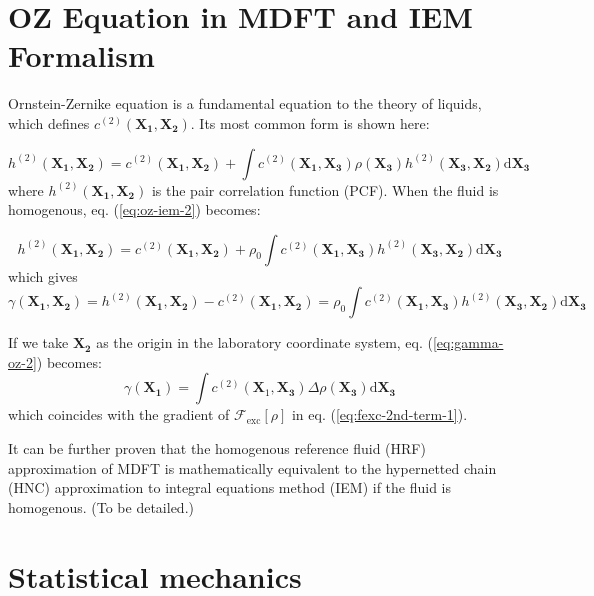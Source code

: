 \section{OZ Equation in MDFT and IEM Formalism}

Ornstein-Zernike equation is a fundamental equation to the theory
of liquids, which defines $c^{(2)}(\mathbf{X_{1}},\mathbf{X_{2}})$.
Its most common form is shown here\citep{Hensen-McDonald}:

\begin{equation}
h^{(2)}(\mathbf{X_{1}},\mathbf{X_{2}})=c^{(2)}(\mathbf{X_{1}},\mathbf{X_{2}})+\int c^{(2)}(\mathbf{X_{1}},\mathbf{X_{3}})\rho(\mathbf{X_{3}})h^{(2)}(\mathbf{X_{3}},\mathbf{X_{2}})\mathrm{d}\mathbf{X_{3}}\label{eq:oz-iem-2}
\end{equation}
where $h^{(2)}(\mathbf{X_{1}},\mathbf{X_{2}})$ is the pair correlation
function (PCF). When the fluid is homogenous, eq. (\ref{eq:oz-iem-2})
becomes:

\begin{equation}
h^{(2)}(\mathbf{X_{1}},\mathbf{X_{2}})=c^{(2)}(\mathbf{X_{1}},\mathbf{X_{2}})+\rho_{0}\int c^{(2)}(\mathbf{X_{1}},\mathbf{X_{3}})h^{(2)}(\mathbf{X_{3}},\mathbf{X_{2}})\mathrm{d}\mathbf{X_{3}}\label{eq:oz-iem-1-1}
\end{equation}
which gives 
\begin{equation}
\gamma(\mathbf{X_{1}},\mathbf{X_{2}})=h^{(2)}(\mathbf{X_{1}},\mathbf{X_{2}})-c^{(2)}(\mathbf{X_{1}},\mathbf{X_{2}})=\rho_{0}\int c^{(2)}(\mathbf{X_{1}},\mathbf{X_{3}})h^{(2)}(\mathbf{X_{3}},\mathbf{X_{2}})\mathrm{d}\mathbf{X_{3}}\label{eq:gamma-oz-2}
\end{equation}


If we take $\mathbf{X_{2}}$ as the origin in the laboratory coordinate
system, eq. (\ref{eq:gamma-oz-2}) becomes:
\begin{equation}
\gamma(\mathbf{X_{1}})=\int c^{(2)}(\mathbf{X}_{1},\mathbf{X_{3}})\Delta\rho(\mathbf{X_{3}})\mathrm{d}\mathbf{X_{3}}\label{eq:gamma-oz-1-1}
\end{equation}
which coincides with the gradient of $\mathcal{F}_{\mathrm{exc}}\left[\rho\right]$
in eq. (\ref{eq:fexc-2nd-term-1}).

It can be further proven that the homogenous reference fluid (HRF)
approximation of MDFT is mathematically
equivalent to the hypernetted chain (HNC) approximation to integral
equations method (IEM) if the fluid is homogenous. (To be detailed.)


\section{Statistical mechanics}



